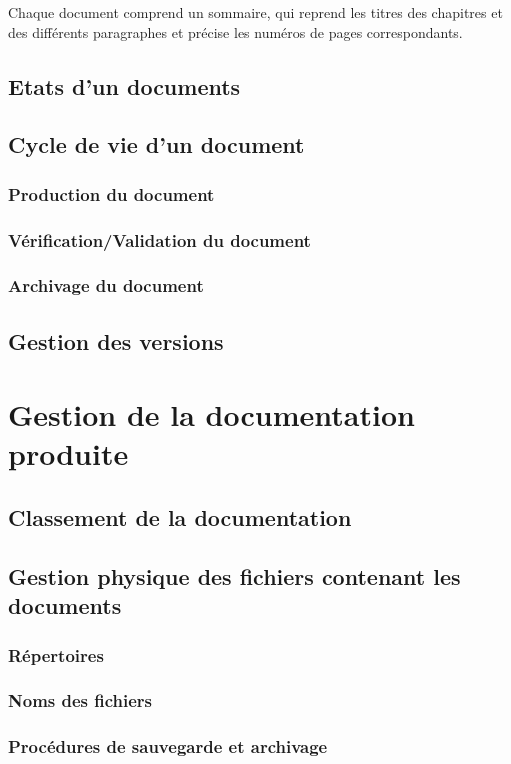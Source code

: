       Chaque document comprend un sommaire, qui reprend les titres des chapitres et des différents paragraphes et précise les numéros de pages correspondants.
  
   
  \subsection{Etats d'un documents}
  
  \subsection{Cycle de vie d'un document}
    \subsubsection{Production du document}
    \subsubsection{Vérification/Validation du document}
    \subsubsection{Archivage du document}
  \subsection{Gestion des versions}
\section{Gestion de la documentation produite}
  \subsection{Classement de la documentation}
  \subsection{Gestion physique des fichiers contenant les documents}     
    \subsubsection{Répertoires}
    \subsubsection{Noms des fichiers}
    \subsubsection{Procédures de sauvegarde et archivage}

